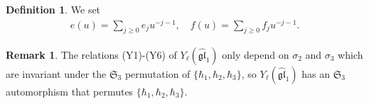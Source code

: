 \documentclass[10pt]{amsart}
\theoremstyle{definition}
\newtheorem{Definition}[Theorem]{Definition}
\newtheorem{Remark}[Theorem]{Remark}
\numberwithin{equation}{section}
\newcommand{\bC}{\mathbb{C}}
\newcommand{\bZ}{\mathbb{Z}}
\newcommand{\Sym}{\operatorname{Sym}}
\begin{document}
\begin{Definition}
We set
\begin{align*}
    e(u)=\sum_{j\geqslant 0}e_ju^{-j-1},\quad f(u)=\sum_{j\geqslant 0}f_ju^{-j-1}.
\end{align*}
\end{Definition}

\begin{Remark}\label{rmk triality}
The relations (Y1)-(Y6) of $Y_\ell(\widehat{\mathfrak{gl}}_1)$ only depend on $\sigma_2$ and $\sigma_3$ which are invariant under the $\mathfrak{S}_3$ permutation of $\{\hbar_1,\hbar_2,\hbar_3\}$, so $Y_\ell(\widehat{\mathfrak{gl}}_1)$ has an $\mathfrak{S}_3$ automorphism that permutes $\{\hbar_1,\hbar_2,\hbar_3\}$.
\end{Remark}
\end{document}

